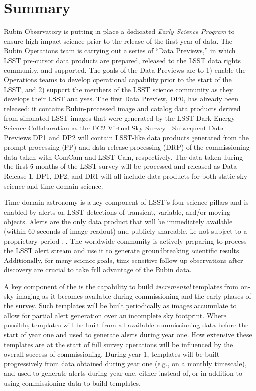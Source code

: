 \section{Summary}

Rubin Observatory is putting in place a dedicated {\it Early Science Program} to ensure high-impact science prior to the release of the first year of \lsst data.
The Rubin Operations team is carrying out a series of ``Data Previews,'' in which LSST pre-cursor data products are prepared, released to the LSST data rights community, and supported.
The goals of the Data Previews are to 1) enable the Operations teams to develop operational capability prior to the start of the LSST, and 2) support the members of the LSST science community as they develops their LSST analyses.
The first Data Preview, DP0, has already been released: it contains Rubin-processed image and catalog data products derived from simulated LSST images that were generated by the LSST Dark Energy Science Collaboration as the DC2 Virtual Sky Survey \citep{2021ApJS..253...31L}.
Subsequent Data Previews DP1 and DP2 will contain LSST-like data products generated from the prompt processing (PP) and data release processing (DRP) of the commissioning data taken with ComCam and LSST Cam, respectively.
The data taken during the first 6 months of the LSST survey will be processed and released as Data Release 1.
DP1, DP2, and DR1 will all include data products for both static-sky science and time-domain science.

Time-domain astronomy is a key component of LSST's four science pillars and is enabled by alerts on LSST detections of transient, variable, and/or moving objects.
Alerts are the only data product that will be immediately available (within 60 seconds of image readout) and publicly shareable, i.e not subject to a proprietary period \citep{LSE-163},  \citep{RDO-013}.
The worldwide community is actively preparing to process the LSST alert stream and use it to generate groundbreaking scientific results. Additionally, for many science goals, time-sensitive follow-up observations after discovery are crucial to take full advantage of the Rubin data.

A key component of the \esp is the capability to build {\it incremental} templates from on-sky imaging as it becomes available during commissioning and the early phases of the survey.
Such templates will be built periodically as images accumulate to allow for partial alert generation over an incomplete sky footprint.
Where possible, templates will be built from all available commissioning data before the start of year one and used to generate alerts during year one.
How extensive these templates are at the start of full survey operations will be influenced by the overall success of commissioning.
During year 1, templates will be built progressively from data obtained during year one (e.g., on a monthly timescale), and used to generate alerts during year one, either instead of, or in addition to using commissioning data to build templates.
